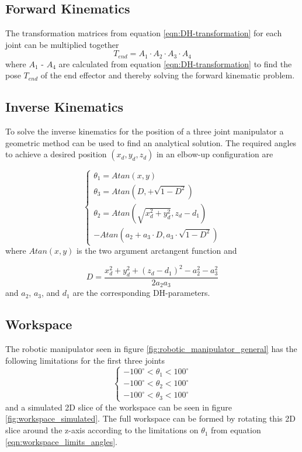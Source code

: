 \subsection*{Forward Kinematics}
The transformation matrices from equation \ref{eqn:DH-transformation} for each joint can be multiplied together
\begin{equation}
    T_{end} = A_1 \cdot A_2 \cdot A_3 \cdot A_4
\end{equation}
where \(A_1\) - \(A_4\) are calculated from equation \ref{eqn:DH-transformation} to find the pose \(T_{end}\) of the end effector and thereby solving the forward kinematic problem.


\subsection*{Inverse Kinematics}
To solve the inverse kinematics for the position of a three joint manipulator a geometric method can be used to find an analytical solution. The required angles to achieve a desired position \((x_d, y_d, z_d)\) in an elbow-up configuration are \cite{Lec14_mit_Manipulation}

\begin{equation}
    \begin{cases}
        \theta_1 = Atan(x, y) \\
        \theta_3 = Atan(D, +\sqrt{1 - D^2}) \\
        \theta_2 = Atan(\sqrt{x_d^2 + y_d^2}, z_d - d_1) \\- Atan(a_2 + a_3 \cdot D, a_3 \cdot \sqrt{1 - D^2}) %
    \end{cases}
\end{equation}
where \(Atan(x, y)\) is the two argument arctangent function \cite{inverse_tangent_wolfram} and 

\begin{equation}
    D = \frac{x_d^2 + y_d^2 + (z_d - d_1)^2 - a_2^2 - a_3^2}{2 a_2 a_3}
\end{equation}
and \(a_2\), \(a_3\), and \(d_1\)   are the corresponding DH-parameters.



\subsection*{Workspace}
The robotic manipulator seen in figure \ref{fig:robotic_manipulator_general} has the following limitations for the first three joints
\begin{equation}
    \begin{cases}
        -100^\circ < \theta_1 < 100^\circ \\
        -100^\circ < \theta_2 < 100^\circ \\
        -100^\circ < \theta_3 < 100^\circ 
    \end{cases}
    \label{eqn:workspace_limits_angles}
\end{equation}
and a simulated 2D slice of the workspace can be seen in figure \ref{fig:workspace_simulated}. The full workspace can be formed by rotating this 2D slice around the z-axis according to the limitations on \(\theta_1\) from equation \ref{eqn:workspace_limits_angles}.


